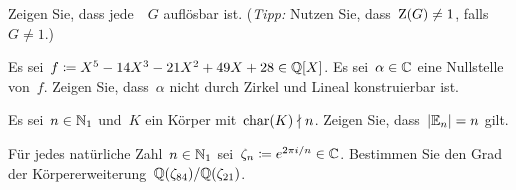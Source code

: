 \documentclass{scrartcl}
\begin{document}
\begin{exercise}
  Zeigen Sie, dass jede~~$G$ auflösbar ist.
  (\emph{Tipp:} Nutzen Sie, dass~$\operatorname{Z}(G) \neq 1$, falls~$G \neq 1$.)
\end{exercise}

\begin{exercise}[subtitle = {Erstklausur~19/20}]
  Es sei~$f \coloneqq X^5 - 14 X^3 - 21 X^2 + 49 X + 28 \in \mathbb{Q}[X]$.
  Es sei~$\alpha \in \mathbb{C}$ eine Nullstelle von~$f$.
  Zeigen Sie, dass~$\alpha$ nicht durch Zirkel und Lineal konstruierbar ist.
\end{exercise}

\begin{exercise}
  Es sei~$n \in \mathbb{N}_1$ und~$K$ ein Körper mit~$\operatorname{char}(K) \nmid n$.
  Zeigen Sie, dass~$\lvert \operatorname{\mathbb{E}}_n \rvert = n$ gilt.
\end{exercise}

\begin{exercise}
  Für jedes natürliche Zahl~$n \in \mathbb{N}_1$ sei~$\zeta_n \coloneqq e^{2 \pi i / n} \in \mathbb{C}$.
  Bestimmen Sie den Grad der Körpererweiterung~$\mathbb{Q}(\zeta_{84}) / \mathbb{Q}(\zeta_{21})$.
\end{exercise}
\end{document}
